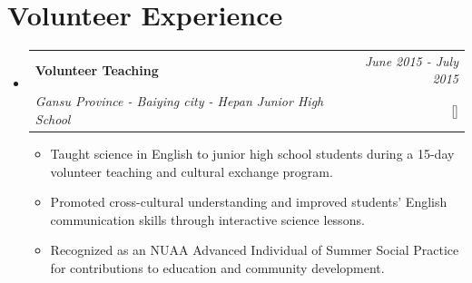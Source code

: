 \documentclass[a4paper,11pt]{article}
\makeatletter
\newcommand{\resumePOR}[3]{
	\vspace{0.5mm}\item
	\begin{tabular*}{0.97\textwidth}[t]{l@{\extracolsep{\fill}}r}
		\textbf{#1}\hspace{0.3mm}#2 & \textit{\small{#3}} 
	\end{tabular*}
	\vspace{-2mm}
}
\newcommand{\resumeProject}[4]{
	\vspace{0.5mm}\item
	\begin{tabular*}{0.98\textwidth}[t]{l@{\extracolsep{\fill}}r}
		\textbf{#1} & \textit{\footnotesize{#3}} \\
		\footnotesize{\textit{#2}} & \footnotesize{#4}
	\end{tabular*}
	\vspace{-2.4mm}
}
\newcommand{\resumeSubHeadingListStart}{\begin{itemize}[leftmargin=*,labelsep=1mm]}
\newcommand{\resumeItemListStart}{\begin{itemize}[leftmargin=*,labelsep=1mm,itemsep=0.5mm]}
\newcommand{\resumeSubHeadingListEnd}{\end{itemize}\vspace{2mm}}
\newcommand{\resumeItemListEnd}{\end{itemize}\vspace{-2mm}}
\makeatother
\begin{document}
	\section{\textbf{Volunteer Experience}}
	\vspace{-0.4mm}
	\resumeSubHeadingListStart

	\resumeProject
	{Volunteer Teaching}
	{Gansu Province - Baiying city - Hepan Junior High School}
	{June 2015 - July 2015}
	{{}[\href{https://1drv.ms/b/c/0b66680558f854cf/EWhZisbqvTNClGJQgjoSEg8BX4o5KTUrmbUno6iK2k-XtA?e=4Ugpkl}{\textcolor{darkblue}{\faIcon{globe}}}]}
	\resumeItemListStart
	\item Taught science in English to junior high school students during a 15-day volunteer teaching and cultural exchange program.
	\item Promoted cross-cultural understanding and improved students' English communication skills through interactive science lessons.
	\item Recognized as an NUAA Advanced Individual of Summer Social Practice for contributions to education and community development.
	\resumeItemListEnd
	
	\resumeSubHeadingListEnd
	\vspace{-6mm}
	

\end{document}
